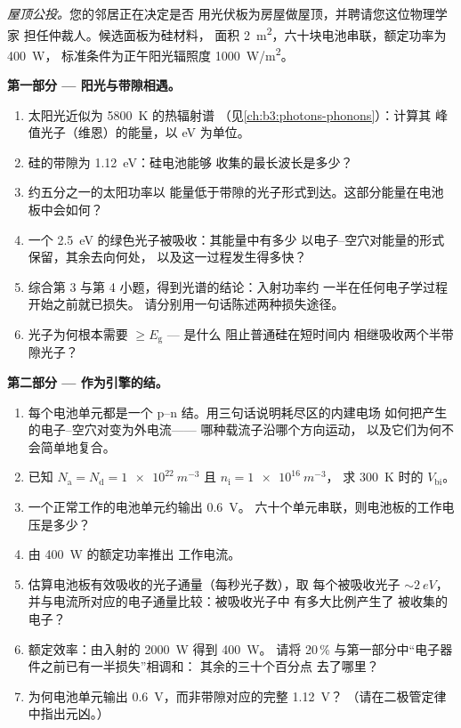 \begin{problem}\label{pb:b3:electrons-in-solids:1}
\emph{屋顶公投。}您的邻居正在决定是否
用光伏板为房屋做屋顶，并聘请您这位物理学家
担任仲裁人。候选面板为硅材料，
面积 \qty{2}{m^2}，六十块电池串联，额定功率为 \qty{400}{W}，
标准条件为正午阳光辐照度 \qty{1000}{W/m^2}。

\medskip\noindent\textbf{第一部分 --- 阳光与带隙相遇。}

\begin{enumerate}
  \item 太阳光近似为 \qty{5800}{K} 的热辐射谱
        （见\cref{ch:b3:photons-phonons}）：计算其
        峰值光子（维恩）的能量，以 eV 为单位。
  \item 硅的带隙为 \qty{1.12}{eV}：硅电池能够
        收集的最长波长是多少？
  \item 约五分之一的太阳功率以
        能量低于带隙的光子形式到达。这部分能量在电池板中会如何？
  \item 一个 \qty{2.5}{eV} 的绿色光子被吸收：其能量中有多少
        以电子–空穴对能量的形式保留，其余去向何处，
        以及这一过程发生得多快？
  \item 综合第 3 与第 4 小题，得到光谱的结论：入射功率约
        一半在任何电子学过程开始之前就已损失。
        请分别用一句话陈述两种损失途径。
  \item 光子为何根本需要 $\ge E_{\text{g}}$ --- 是什么
        阻止普通硅在短时间内
        相继吸收两个半带隙光子？
\end{enumerate}

\medskip\noindent\textbf{第二部分 --- 作为引擎的结。}

\begin{enumerate}[resume]
  \item 每个电池单元都是一个 p--n 结。用三句话说明耗尽区的内建电场
        如何把产生的电子–空穴对变为外电流——
        哪种载流子沿哪个方向运动，
        以及它们为何不会简单地复合。
  \item 已知 $N_{\text{a}} = N_{\text{d}} = \qty{1e22}{m^{-3}}$
        且 $n_{\text{i}} = \qty{1e16}{m^{-3}}$，
        求 \qty{300}{K} 时的 $V_{\text{bi}}$。
  \item 一个正常工作的电池单元约输出 \qty{0.6}{V}。
        六十个单元串联，则电池板的工作电压是多少？
  \item 由 \qty{400}{W} 的额定功率推出
        工作电流。
  \item 估算电池板有效吸收的光子通量（每秒光子数），取
        每个被吸收光子 $\sim\qty{2}{eV}$，
        并与电流所对应的电子通量比较：被吸收光子中
        有多大比例产生了
        被收集的电子？
  \item 额定效率：由入射的 \qty{2000}{W} 得到 \qty{400}{W}。
        请将 20\,\% 与第一部分中“电子器件之前已有一半损失”相调和：
        其余的三十个百分点
        去了哪里？
  \item 为何电池单元输出 \qty{0.6}{V}，而非带隙对应的完整
        \qty{1.12}{V}？
        （请在二极管定律中指出元凶。）
\end{enumerate}


\end{problem}
